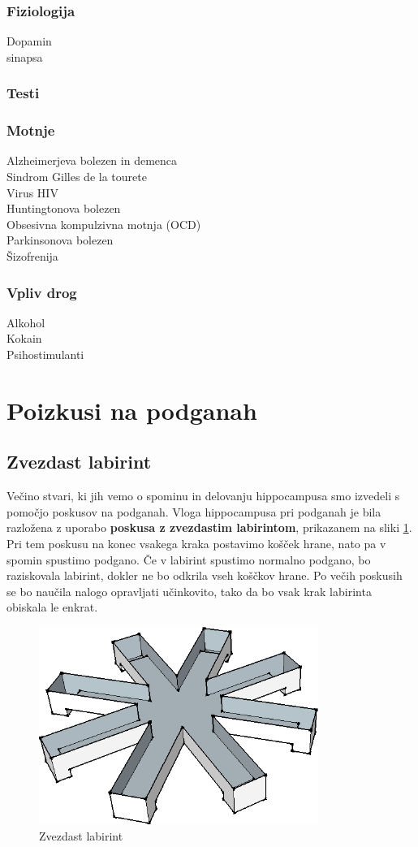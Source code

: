 \documentclass[10pt,a4paper]{article}
\begin{document}
\subsubsection{Fiziologija}
Dopamin\\
sinapsa

\subsubsection{Testi}

\subsubsection{Motnje}
Alzheimerjeva bolezen in demenca\\
Sindrom Gilles de la tourete\\
Virus HIV\\
Huntingtonova bolezen\\
Obsesivna kompulzivna motnja (OCD)\\
Parkinsonova bolezen\\
Šizofrenija

\subsubsection{Vpliv drog}
Alkohol\\
Kokain\\
Psihostimulanti

\section{Poizkusi na podganah}
\subsection{Zvezdast labirint}
Večino stvari, ki jih vemo o spominu in delovanju hippocampusa smo izvedeli s pomočjo poskusov na podganah. Vloga hippocampusa pri podganah je bila razložena z uporabo \textbf{poskusa z zvezdastim labirintom}, prikazanem na sliki \ref{slikaLabirinta}. Pri tem poskusu na konec vsakega kraka postavimo košček hrane, nato pa v spomin spustimo podgano. Če v labirint spustimo normalno podgano, bo raziskovala labirint, dokler ne bo odkrila vseh koščkov hrane. Po večih poskusih se bo naučila nalogo opravljati učinkovito, tako da bo vsak krak labirinta obiskala le enkrat.

\begin{figure}[h]
  \centering
    \includegraphics[width=.5\textwidth]{Labirint.png}
  \caption{Zvezdast labirint}
  \label{slikaLabirinta}
\end{figure}
\end{document}
